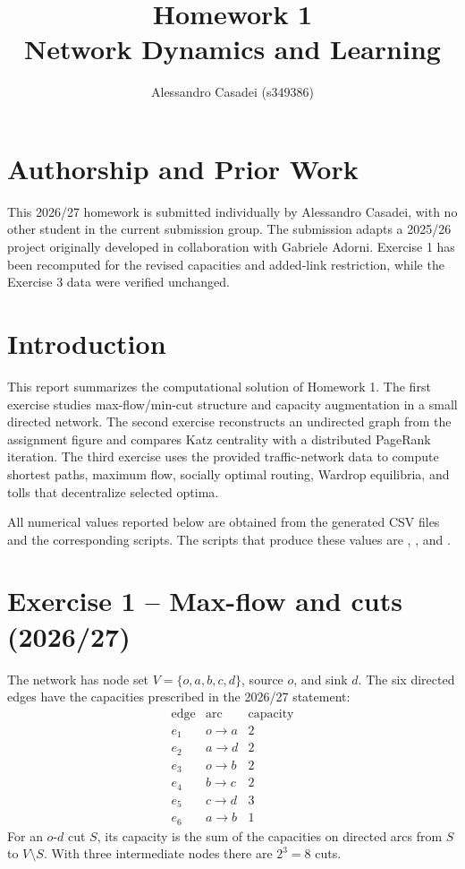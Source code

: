 \documentclass[11pt,a4paper]{article}
\title{Homework 1\\Network Dynamics and Learning}
\author{Alessandro Casadei (s349386)}
\date{}
\begin{document}
\maketitle

\section*{Authorship and Prior Work}

This 2026/27 homework is submitted individually by Alessandro Casadei, with
no other student in the current submission group. The submission adapts a
2025/26 project originally developed in collaboration with Gabriele Adorni.
Exercise 1 has been recomputed for the revised capacities and added-link
restriction, while the Exercise 3 data were verified unchanged.

\section{Introduction}

This report summarizes the computational solution of Homework 1. The first
exercise studies max-flow/min-cut structure and capacity augmentation in a
small directed network. The second exercise reconstructs an undirected graph
from the assignment figure and compares Katz centrality with a distributed
PageRank iteration. The third exercise uses the provided traffic-network data
to compute shortest paths, maximum flow, socially optimal routing, Wardrop
equilibria, and tolls that decentralize selected optima.

All numerical values reported below are obtained from the generated CSV files and
the corresponding scripts. The scripts that produce these values are
, , and
.

\section{Exercise 1 -- Max-flow and cuts (2026/27)}

The network has node set \(V=\{o,a,b,c,d\}\), source \(o\), and sink \(d\).
The six directed edges have the capacities prescribed in the 2026/27 statement:
\[
\begin{array}{c|c|c}
\text{edge} & \text{arc} & \text{capacity}\\
\hline
e_1 & o\to a & 2\\
e_2 & a\to d & 2\\
e_3 & o\to b & 2\\
e_4 & b\to c & 2\\
e_5 & c\to d & 3\\
e_6 & a\to b & 1
\end{array}
\]
For an \(o\)-\(d\) cut \(S\), its capacity is the sum of the capacities
on directed arcs from \(S\) to \(V\setminus S\). With three intermediate nodes
there are \(2^3=8\) cuts.
\end{document}
